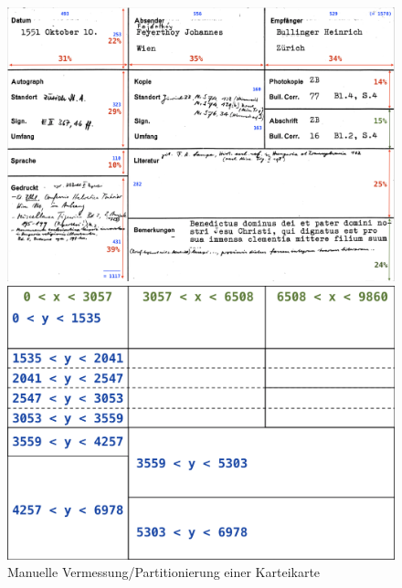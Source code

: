 \begin{figure}[H]
	\begin{minipage}[t]{0.45\textwidth}
		\begin{center}
			\includegraphics[scale=0.25]{Bilder/Karteikarte_Original.png}
		\end{center}
	\end{minipage}
	\begin{minipage}[t]{0.45\textwidth}
		\begin{center}
			\includegraphics[scale=0.25]{Bilder/Karteikartenmasse.png}
		\end{center}
	\end{minipage}
    \caption{Manuelle Vermessung/Partitionierung einer Karteikarte}
    \label{fig:sample_figure}
\end{figure}

